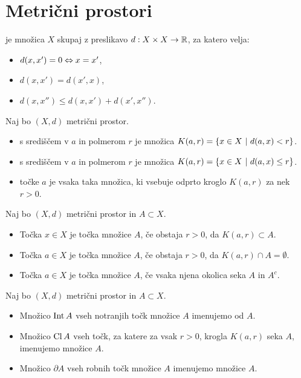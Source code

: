 \section*{Metrični prostori}
\begin{definicija}
     je množica $X$ skupaj z preslikavo $d: X \times X \to \mathbb{R}$, za katero velja:
    \begin{itemize}
        \item $d(x, x') = 0 \Leftrightarrow x=x'$,
        \item $d(x, x') = d(x', x)$,
        \item $d(x, x'') \leq d(x, x') + d(x', x'')$.
    \end{itemize}
\end{definicija}

\begin{definicija}
    Naj bo $(X, d)$ metrični prostor. 
    \begin{itemize}
        \item {} s središčem v $a$ in polmerom $r$ je množica $K(a, r) = \left\{x \in X \ | \ d(a,x) < r\right\}$.
        \item {} s središčem v $a$ in polmerom $r$ je množica $K(a, r) = \left\{x \in X \ | \ d(a,x) \leq r\right\}$. 
        \item {} točke $a$ je vsaka taka množica, ki vsebuje odprto kroglo $K(a, r)$ za nek $r>0$.
    \end{itemize}    
\end{definicija}

\begin{definicija}
    Naj bo $(X, d)$ metrični prostor in $A \subset X$.
    \begin{itemize}
        \item Točka $x \in X$ je  točka množice $A$, če obstaja $r>0$, da $K(a,r) \subset A$.
        \item Točka $a \in X$ je  točka množice $A$, če obstaja $r>0$, da $K(a,r) \cap A = \emptyset$.
        \item Točka $a \in X$ je  točka množice $A$, če vsaka njena okolica seka $A$ in $A^c$.
    \end{itemize}
\end{definicija}

\begin{definicija}
    Naj bo $(X, d)$ metrični prostor in $A \subset X$.
    \begin{itemize}
        \item Množico $\operatorname{Int} A$ vseh notranjih točk množice $A$ imenujemo  od $A$.
        \item Množico $\operatorname{Cl} A$ vseh točk, za katere za vsak $r>0$, krogla $K(a, r)$ seka $A$, imenujemo  množice $A$.
        \item Množico $\partial A$ vseh robnih točk množice $A$ imenujemo  množice $A$.     
    \end{itemize}
\end{definicija}

